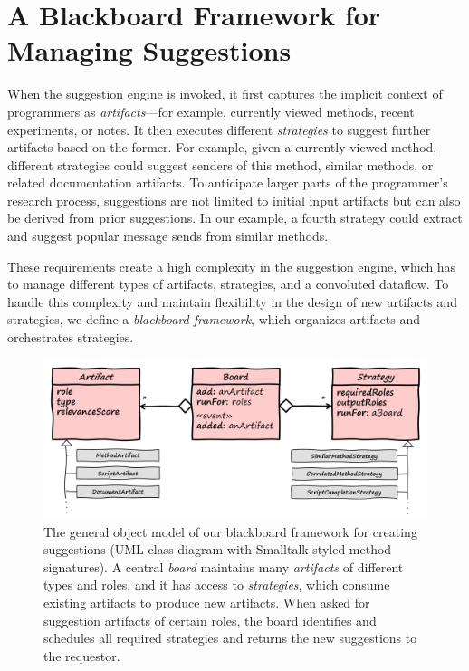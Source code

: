 
\section{A Blackboard Framework for Managing Suggestions}
\label{sec:design/suggestions}

When the suggestion engine is invoked, it first captures the implicit context of programmers as \emph{artifacts}---for example, currently viewed methods, recent experiments, or notes.
It then executes different \emph{strategies} to suggest further artifacts based on the former.
For example, given a currently viewed method, different strategies could suggest senders of this method, similar methods, or related documentation artifacts.
To anticipate larger parts of the programmer's research process, suggestions are not limited to initial input artifacts but can also be derived from prior suggestions.
In our example, a fourth strategy could extract and suggest popular message sends from similar methods.

These requirements create a high complexity in the suggestion engine, which has to manage different types of artifacts, strategies, and a convoluted dataflow.
To handle this complexity and maintain flexibility in the design of new artifacts and strategies, we define a \emph{blackboard framework}, which organizes artifacts and orchestrates strategies.

\begin{figure}
	\centering
	\includegraphics[width=\textwidth]{02_suggestions/classes.png}
	\caption[The general object model of our \emph{blackboard framework} for creating suggestions.]{
		The general object model of our blackboard framework for creating suggestions (UML class diagram with Smalltalk-styled method signatures).
		A central \emph{board} maintains many \emph{artifacts} of different types and roles, and it has access to \emph{strategies}, which consume existing artifacts to produce new artifacts.
		When asked for suggestion artifacts of certain roles, the board identifies and schedules all required strategies and returns the new suggestions to the requestor.
	}
	\label{fig:design/suggestions/classes}
\end{figure}

